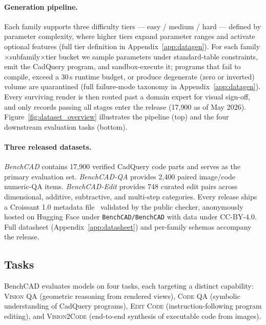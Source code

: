 \paragraph{Generation pipeline.} Each family supports three difficulty tiers --- easy / medium / hard --- defined by parameter complexity, where higher tiers expand parameter ranges and activate optional features (full tier definition in Appendix~\ref{app:datagen}).
For each family$\times$subfamily$\times$tier bucket we sample parameters under standard-table constraints, emit the CadQuery program, and sandbox-execute it; programs that fail to compile, exceed a 30\,s runtime budget, or produce degenerate (zero or inverted) volume are quarantined (full failure-mode taxonomy in Appendix~\ref{app:datagen}).
Every surviving render is then routed past a domain expert for visual sign-off, and only records passing all stages enter the release (17{,}900 as of May 2026). Figure~\ref{fig:dataset_overview} illustrates the pipeline (top) and the four downstream evaluation tasks (bottom).

\paragraph{Three released datasets.} \emph{BenchCAD} contains 17{,}900 verified CadQuery code parts and serves as the primary evaluation set. \emph{BenchCAD-QA} provides 2{,}400 paired image/code numeric-QA items. \emph{BenchCAD-Edit} provides 748 curated edit pairs across dimensional, additive, subtractive, and multi-step categories.
Every release ships a Croissant 1.0 metadata file~\citep{Croissant2024} validated by the public checker, anonymously hosted on Hugging Face under \texttt{BenchCAD/BenchCAD} with data under CC-BY-4.0. Full datasheet (Appendix~\ref{app:datasheet}) and per-family schemas accompany the release.

\subsection{Tasks}
\label{sec:tasks}

BenchCAD evaluates models on four tasks, each targeting a distinct capability: \textsc{Vision QA} (geometric reasoning from rendered views), \textsc{Code QA} (symbolic understanding of CadQuery programs), \textsc{Edit Code} (instruction-following program editing), and \textsc{Vision2Code} (end-to-end synthesis of executable code from images).

